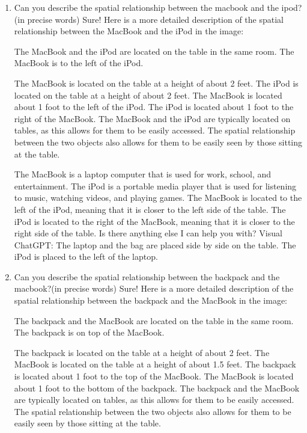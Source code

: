\begin{enumerate}
    \item Can you describe the spatial relationship between the macbook and the ipod?(in precise words)
    \subitem 
    Sure! Here is a more detailed description of the spatial relationship between the MacBook and the iPod in the image:
    
    The MacBook and the iPod are located on the table in the same room. The MacBook is to the left of the iPod.
    
    The MacBook is located on the table at a height of about 2 feet.
    The iPod is located on the table at a height of about 2 feet.
    The MacBook is located about 1 foot to the left of the iPod.
    The iPod is located about 1 foot to the right of the MacBook.
    The MacBook and the iPod are typically located on tables, as this allows for them to be easily accessed. The spatial relationship between the two objects also allows for them to be easily seen by those sitting at the table.
    
    The MacBook is a laptop computer that is used for work, school, and entertainment.
    The iPod is a portable media player that is used for listening to music, watching videos, and playing games.
    The MacBook is located to the left of the iPod, meaning that it is closer to the left side of the table.
    The iPod is located to the right of the MacBook, meaning that it is closer to the right side of the table.
    Is there anything else I can help you with?
    \subitem Visual ChatGPT: The laptop and the bag are placed side by side on the table. The iPod is placed to the left of the laptop.
    \item Can you describe the spatial relationship between the backpack and the macbook?(in precise words)
    \subitem Sure! Here is a more detailed description of the spatial relationship between the backpack and the MacBook in the image:

    The backpack and the MacBook are located on the table in the same room. The backpack is on top of the MacBook.
    
    The backpack is located on the table at a height of about 2 feet.
    The MacBook is located on the table at a height of about 1.5 feet.
    The backpack is located about 1 foot to the top of the MacBook.
    The MacBook is located about 1 foot to the bottom of the backpack.
    The backpack and the MacBook are typically located on tables, as this allows for them to be easily accessed. The spatial relationship between the two objects also allows for them to be easily seen by those sitting at the table.
    

\end{enumerate}
